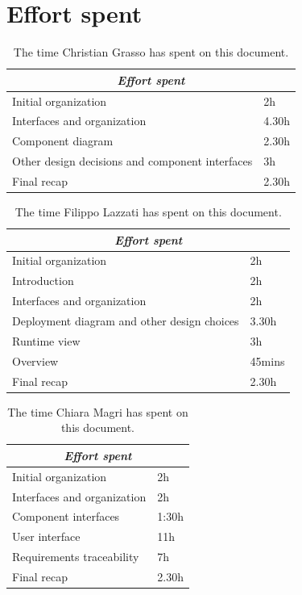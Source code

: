\documentclass{article}
\begin{document}
\section{Effort spent}
\centering
\begin{longtable}{|m{5cm}|m{5cm}|}
\caption{The time Christian Grasso has spent on this document.}
 \label{christian effort spent}
 \hline
 \multicolumn{2}{|c|}{\cellcolor{white}\emph{Effort spent}} \\
 \endfirsthead
 \endhead
 \endfoot
 \endlastfoot
 \hline
 Initial organization & 2h\\
 \hline
 Interfaces and organization & 4.30h\\
 \hline
 Component diagram & 2.30h\\
 \hline
 Other design decisions and component interfaces & 3h\\
 \hline
 Final recap & 2.30h\\
 \hline
\end{longtable}

\centering
\begin{longtable}{|m{5cm}|m{5cm}|}
\caption{The time Filippo Lazzati has spent on this document.}
 \label{filippo effort spent}
 \hline
 \multicolumn{2}{|c|}{\cellcolor{white}\emph{Effort spent}} \\
 \endfirsthead
 \endhead
 \endfoot
 \endlastfoot
 \hline
 Initial organization & 2h\\
 \hline
 Introduction & 2h\\
 \hline
 Interfaces and organization & 2h\\
 \hline
Deployment diagram and other design choices & 3.30h\\
 \hline
 Runtime view & 3h\\
 \hline
 Overview & 45mins\\
 \hline
  Final recap & 2.30h\\
 \hline
\end{longtable}

\centering
\begin{longtable}{|m{5cm}|m{5cm}|}
\caption{The time Chiara Magri has spent on this document.}
 \label{chiara effort spent}
 \hline
 \multicolumn{2}{|c|}{\cellcolor{white}\emph{Effort spent}} \\
 \endfirsthead
 \endhead
 \endfoot
 \endlastfoot
 \hline
 Initial organization & 2h\\
 \hline
 Interfaces and organization & 2h\\
 \hline
 Component interfaces & 1:30h \\
 \hline
 User interface & 11h\\
\hline
  Requirements traceability & 7h \\
  \hline
  Final recap & 2.30h\\
 \hline
\end{longtable}
\newpage
\end{document}
